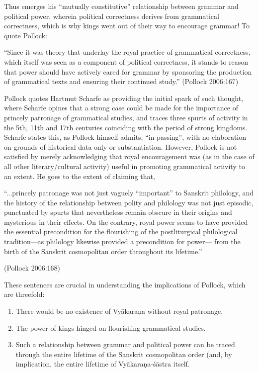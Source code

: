 Thus emerges his ``mutually constitutive'' relationship between grammar and political power, wherein political correctness derives from grammatical correctness, which is why kings went out of their way to encourage grammar! To quote Pollock:
\begin{myquote}
``Since it was theory that underlay the royal practice of grammatical correctness, which itself was seen as a component of political correctness, it stands to reason that power should have actively cared for grammar by sponsoring the production of grammatical texts and ensuring their continued study.''
\hfill (Pollock 2006:167)
\end{myquote}

Pollock quotes Hartmut Scharfe as providing the initial spark of such thought, where Scharfe opines that a strong case could be made for the importance of princely patronage of grammatical studies, and traces three spurts of activity in the 5th, 11th and 17th centuries coinciding with the period of strong kingdoms. Scharfe states this, as Pollock himself admits, ``in passing'', with no elaboration on grounds of historical data only or substantiation. However, Pollock is not satisfied by merely acknowledging that royal encouragement was (as in the case of all other literary/cultural activity) useful in promoting grammatical activity to an extent. He goes to the extent of claiming that,
\begin{myquote}
``...princely patronage was not just vaguely ``important'' to Sanskrit philology, and the history of the relationship between polity and philology was not just episodic, punctuated by spurts that nevertheless remain obscure in their origins and mysterious in their effects. On the contrary, royal power seems to have provided the essential precondition for the flourishing of the postliturgical philological tradition---as philology likewise provided a precondition for power--- from the birth of the Sanskrit cosmopolitan order throughout its lifetime.''

\hfill (Pollock 2006:168)
\end{myquote}

These sentences are crucial in understanding the implications of Pollock, which are threefold:
\begin{enumerate}
\item There would be no existence of Vyākaraṇa without royal patronage. 
\item The power of kings hinged on flourishing grammatical studies.
\item Such a relationship between grammar and political power can be traced through the entire lifetime of the Sanskrit cosmopolitan order (and, by implication, the entire lifetime of Vyākaraṇa-śāstra itself.
\end{enumerate}

